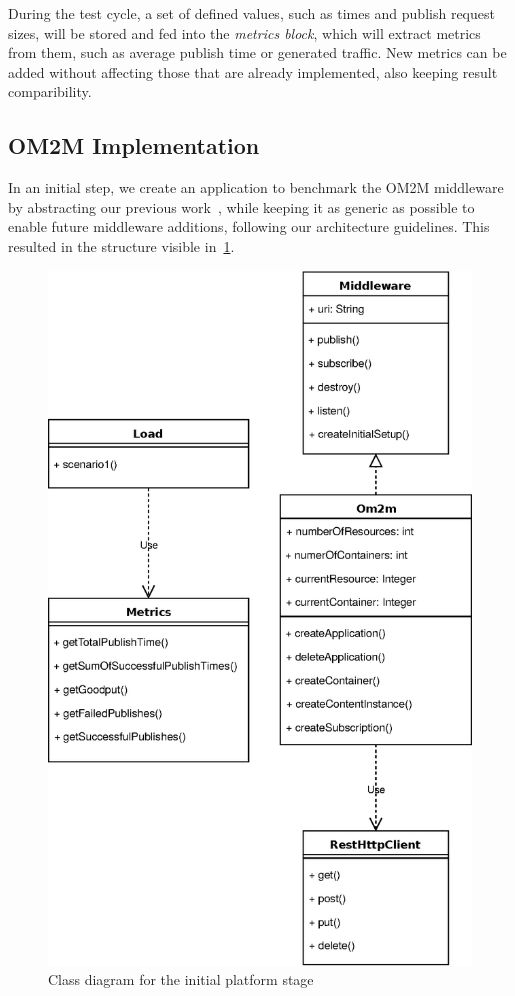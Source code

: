 \documentclass[conference]{IEEEtran}
\begin{document}
During the test cycle, a set of defined values, such as times and publish request sizes, will be stored and fed into the \textit{metrics block}, which will extract metrics from them, such as average publish time or generated traffic. New metrics can be added without affecting those that are already implemented, also keeping result comparibility. 

\subsection{OM2M Implementation}
In an initial step, we create an application to benchmark the OM2M middleware by abstracting our previous work~\cite{pereira_benchmarking_2018,cardoso_benchmarking_2017}, while keeping it as generic as possible to enable future middleware additions, following our architecture guidelines. This resulted in the structure visible in~\ref{fig:class_diagram_om2m}.

\begin{figure}[htbp!]
  \centering
  \includegraphics[width=\linewidth]{figures/class_diagram.eps}
  \caption{Class diagram for the initial platform stage}
  \label{fig:class_diagram_om2m}
\end{figure}
\end{document}
